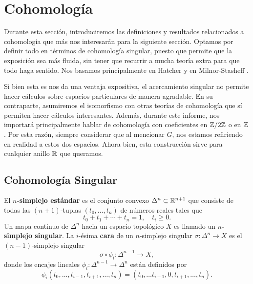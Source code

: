 \newpage
\section{Cohomología}


Durante esta sección, introduciremos las definiciones y resultados relacionados a cohomología que más nos interesarán para la siguiente sección. Optamos por definir todo en términos de cohomología singular, puesto que permite que la exposición sea más fluida, sin tener que recurrir a mucha teoría extra para que todo haga sentido. Nos basamos principalmente en Hatcher \cite[\S 2]{HatcherAlgTop} y en Milnor-Stasheff \cite[Apéndice A.1]{ClasesCaracteristicas}. \par
Si bien esta es nos da una ventaja expositiva, el acercamiento singular no permite hacer cálculos sobre espacios particulares de manera agradable. En su contraparte, asumiremos el isomorfismo con otras teorías de cohomología que sí permiten hacer cálculos interesantes.
Además, durante este informe, nos importará principalmente hablar de cohomología con coeficientes en $\mathbb{Z} \slash 2\mathbb{Z}$ o en $\mathbb{Z}$. Por esta razón, siempre considerar que al mencionar $G$, nos estamos refiriendo en realidad a estos dos espacios. Ahora bien, esta construcción sirve para cualquier anillo $\mathbb{R}$ que queramos.

\subsection{Cohomología Singular}

\begin{definition}
	El \textbf{$n$-simplejo estándar} es el conjunto convexo $\Delta^{n} \subset \mathbb{R}^{n+1}$ que consiste de todas las $(n+1)$-tuplas $(t_{0},\dots,t_{n})$ de números reales tales que
	\[ t_{0} + t_{1} + \cdots + t_{n} = 1, \quad t_{i} \geq 0. \]
	Un mapa continuo de $\Delta^{n}$ hacia un espacio topológico $X$ es llamado un \textbf{$n$-simplejo singular}. La $i$-ésima \textbf{cara} de un $n$-simplejo singular $\sigma \colon \Delta^{n} \to X$ es el $(n-1)$-simplejo singular
	\[ \sigma \circ \phi_{i} \colon \Delta^{n-1} \to X, \]
	donde los encajes lineales $\phi_{i} \colon \Delta^{n-1} \to \Delta^{n}$ están definidos por
	\[ \phi_{i}(t_{0},\dots, t_{i-1}, t_{i+1}, \dots, t_{n}) = (t_{0}, \dots t_{i-1}, 0, t_{i+1},\dots, t_{n}). \]
\end{definition}

